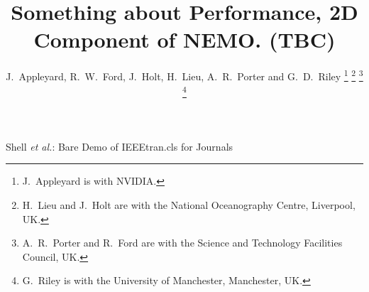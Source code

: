 \documentclass[journal]{IEEEtran}
\begin{document}
%
\title{Something about Performance, 2D Component of NEMO. (TBC)}
%
%

\author{J.~Appleyard, R.~W.~Ford, J.~Holt, H.~Lieu, A.~R.~Porter and G.~D.~Riley%
\thanks{J.~Appleyard is with NVIDIA.}%
\thanks{H.~Lieu and J.~Holt are with the National Oceanography Centre, Liverpool, UK.}%
\thanks{A.~R.~Porter and R.~Ford are with the Science and Technology Facilities Council, UK.}%
\thanks{G.~Riley is with the University of Manchester, Manchester, UK.}%
}

% 
%


%
{Shell \MakeLowercase{\textit{et al.}}: Bare Demo of IEEEtran.cls for Journals}
% 




\end{document}
